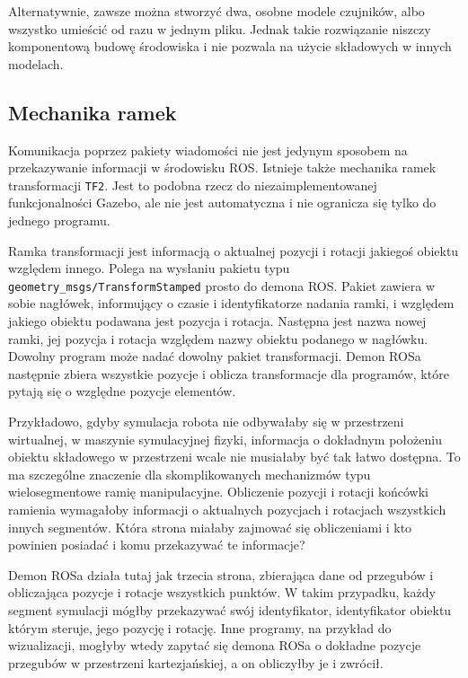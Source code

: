 		Alternatywnie, zawsze można stworzyć dwa, osobne modele czujników, albo wszystko umieścić od razu w jednym pliku.
		Jednak takie rozwiązanie niszczy komponentową budowę środowiska i nie pozwala na użycie składowych w innych modelach.
		
	\subsection{Mechanika ramek}
	Komunikacja poprzez pakiety wiadomości nie jest jedynym sposobem na przekazywanie informacji w środowisku ROS.
	Istnieje także mechanika ramek transformacji \texttt{TF2}.
	Jest to podobna rzecz do niezaimplementowanej funkcjonalności Gazebo, ale nie jest automatyczna i nie ogranicza się tylko do jednego programu.
	
	Ramka transformacji jest informacją o aktualnej pozycji i rotacji jakiegoś obiektu względem innego.
	Polega na wysłaniu pakietu typu \texttt{geometry\_msgs/TransformStamped} prosto do demona ROS.
	Pakiet zawiera w sobie nagłówek, informujący o czasie i identyfikatorze nadania ramki, i względem jakiego obiektu podawana jest pozycja i rotacja.
	Następna jest nazwa nowej ramki, jej pozycja i rotacja względem nazwy obiektu podanego w nagłówku.
	Dowolny program może nadać dowolny pakiet transformacji.
	Demon ROSa następnie zbiera wszystkie pozycje i oblicza transformacje dla programów, które pytają się o względne pozycje elementów.
	
	Przykładowo, gdyby symulacja robota nie odbywałaby się w przestrzeni wirtualnej, w maszynie symulacyjnej fizyki, 
	informacja o dokładnym położeniu obiektu składowego w przestrzeni wcale nie musiałaby być tak łatwo dostępna.
	To ma szczególne znaczenie dla skomplikowanych mechanizmów typu wielosegmentowe ramię manipulacyjne.
	Obliczenie pozycji i rotacji końcówki ramienia wymagałoby informacji o aktualnych pozycjach i rotacjach wszystkich innych segmentów.
	Która strona miałaby zajmować się obliczeniami i kto powinien posiadać i komu przekazywać te informacje?
	
	Demon ROSa działa tutaj jak trzecia strona, zbierająca dane od przegubów i obliczająca pozycje i rotacje wszystkich punktów.
	W takim przypadku, każdy segment symulacji mógłby przekazywać swój identyfikator, identyfikator obiektu którym steruje, jego pozycję i rotację.
	Inne programy, na przykład do wizualizacji, mogłyby wtedy zapytać się demona ROSa o dokładne pozycje przegubów w przestrzeni kartezjańskiej, a on obliczyłby je i zwrócił.
	
